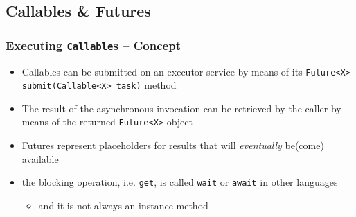 \documentclass{beamer}\mode<presentation>{\usetheme{AMSCesenaPurpleAndGold}}
\begin{document}
\subsection{Callables \& Futures}

\begin{frame}[allowframebreaks]
\frametitle{Executing \texttt{Callable}s -- Concept}

	
	
	\framebreak

	\begin{itemize}
		\item Callables can be \alert{submitted} on an executor service by means of its \texttt{Future<X> submit(Callable<X> task)} method
		
		\vspace{.5cm}
		
		\item The result of the asynchronous invocation can be retrieved by the caller by means of the returned \texttt{Future<X>} object
		
		\vspace{.5cm}
		
		\item Futures represent \alert{placeholders} for results that will \emph{eventually} be(come) available
	\end{itemize}

	\framebreak
	
	
	
	\begin{itemize}
		\item the blocking operation, i.e. \texttt{get}, is called \texttt{wait} or \texttt{\alert{await}} in other languages
		\begin{itemize}
			\item and it is not always an instance method
		\end{itemize}
	\end{itemize}

	\framebreak


\end{frame}
\end{document}

